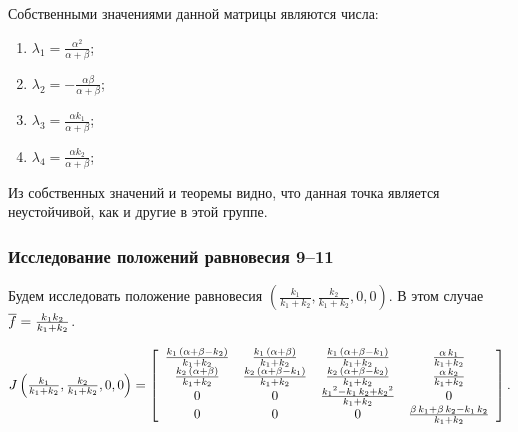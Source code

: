 \documentclass[12pt]{article}
\theoremstyle{rusdef}
\newcommand*{\hm}[1]{#1\nobreak\discretionary{}{\hbox{$\mathsurround=0pt #1$}}{}}
\begin{document}
	Собственными значениями данной матрицы являются числа:
	\begin{enumerate}
		\item
		$\lambda_1 = \frac{\alpha^2}{\alpha + \beta}$;
		\item
		$\lambda_2 = -\frac{\alpha \beta}{\alpha + \beta}$;
		\item
		$\lambda_3 = \frac{\alpha k_1}{\alpha + \beta}$;
		\item
		$\lambda_4 = \frac{\alpha k_2}{\alpha + \beta}$;
	\end{enumerate}
	
	Из собственных значений и теоремы видно, что данная точка является неустойчивой, как и другие в этой группе.
	
	\subsubsection{Исследование положений равновесия 9--11}
	
	Будем исследовать положение равновесия 	$\left( \tfrac{k_1}{k_1 + k_2}, \tfrac{k_2}{k_1 + k_2}, 0, 0 \right)$. В этом случае $\overline{f} \hm= \frac{k_1 k_2}{k_1 + k_2}$.
	
	\begin{gather}
	J\left(  \tfrac{k_1}{k_1 + k_2}, \tfrac{k_2}{k_1 + k_2}, 0, 0 \right) = \left[
\begin{array}{cccc} \frac{k_{1}\, \left(\alpha + \beta - k_{2}\right)}{k_{1} + k_{2}} & \frac{k_{1}\, \left(\alpha + \beta\right)}{k_{1} + k_{2}} & \frac{k_{1}\, \left(\alpha + \beta - k_{1}\right)}{k_{1} + k_{2}} & \frac{\alpha\, k_{1}}{k_{1} + k_{2}}\\ \frac{k_{2}\, \left(\alpha + \beta\right)}{k_{1} + k_{2}} & \frac{k_{2}\, \left(\alpha + \beta - k_{1}\right)}{k_{1} + k_{2}} & \frac{k_{2}\, \left(\alpha + \beta - k_{2}\right)}{k_{1} + k_{2}} & \frac{\alpha\, k_{2}}{k_{1} + k_{2}}\\ 0 & 0 & \frac{{k_{1}}^2 - k_{1}\, k_{2} + {k_{2}}^2}{k_{1} + k_{2}} & 0\\ 0 & 0 & 0 & \frac{\beta\, k_{1} + \beta\, k_{2} - k_{1}\, k_{2}}{k_{1} + k_{2}} \end{array}
	\right]. \notag
	\end{gather}
	
\end{document}

